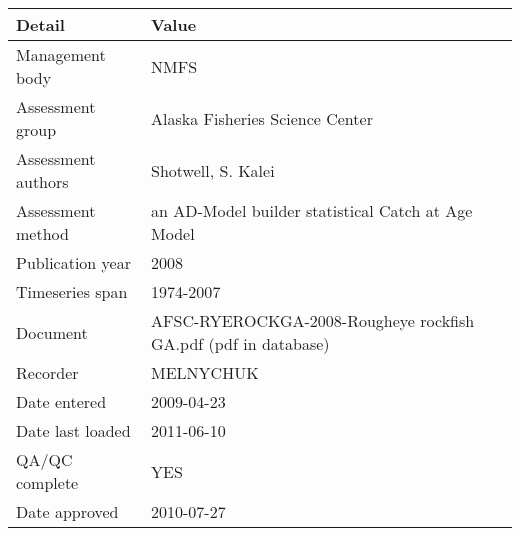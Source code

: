 \begin{table}[htb]
\centering
\begin{tabular}{lp{7cm}}
\toprule
Detail & Value \\
\midrule
Management body    & NMFS                                                           \\
Assessment group   & Alaska Fisheries Science Center                                \\
Assessment authors & Shotwell, S. Kalei                                             \\
Assessment method  & an AD-Model builder statistical Catch at Age Model             \\
Publication year   & 2008                                                           \\
Timeseries span    & 1974-2007                                                      \\
Document           & AFSC-RYEROCKGA-2008-Rougheye rockfish GA.pdf (pdf in database) \\
Recorder           & MELNYCHUK                                                      \\
Date entered       & 2009-04-23                                                     \\
Date last loaded   & 2011-06-10                                                     \\
QA/QC complete     & YES                                                            \\
Date approved      & 2010-07-27                                                     \\
\bottomrule
\end{tabular}
\label{tab:assessdet}
\end{table}
